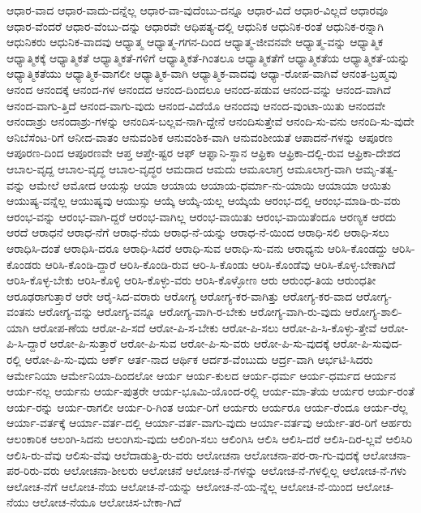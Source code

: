 {ಆಧಾರ-ವಾದ
ಆಧಾರ-ವಾದು-ದನ್ನೆಲ್ಲ
ಆಧಾರ-ವಾ-ವುದೆಂಬು-ದನ್ನೂ
ಆಧಾರ-ವಿದೆ
ಆಧಾರ-ವಿಲ್ಲದೆ
ಆಧಾರವೂ
ಆಧಾರ-ವೆಂದರೆ
ಆಧಾರ-ವೆಂಬು-ದನ್ನು
ಆಧಾರವೇ
ಆಧಿಪತ್ಯ-ದಲ್ಲಿ
ಆಧುನಿಕ
ಆಧುನಿಕ-ರಂತೆ
ಆಧುನಿಕ-ರನ್ನಾಗಿ
ಆಧುನಿಕರು
ಆಧುನಿಕ-ವಾದವು
ಆಧ್ಯಾತ್ಮ
ಆಧ್ಯಾತ್ಮ-ಗಗನ-ದಿಂದ
ಆಧ್ಯಾತ್ಮ-ಜೀವನವೇ
ಆಧ್ಯಾತ್ಮ-ವನ್ನು
ಆಧ್ಯಾತ್ಮಿಕ
ಆಧ್ಯಾತ್ಮಿಕಕ್ಕೆ
ಆಧ್ಯಾತ್ಮಿಕತೆ
ಆಧ್ಯಾತ್ಮಿಕತೆ-ಗಳಿಗೆ
ಆಧ್ಯಾತ್ಮಿಕತೆ-ಗಿಂತಲೂ
ಆಧ್ಯಾತ್ಮಿಕತೆಗೆ
ಆಧ್ಯಾತ್ಮಿಕತೆಯ
ಆಧ್ಯಾತ್ಮಿಕತೆ-ಯನ್ನು
ಆಧ್ಯಾತ್ಮಿಕತೆಯು
ಆಧ್ಯಾತ್ಮಿಕ-ವಾಗಲೀ
ಆಧ್ಯಾತ್ಮಿಕ-ವಾಗಿ
ಆಧ್ಯಾತ್ಮಿಕ-ವಾದವು
ಆಧ್ಯಾ-ರೋಪ-ವಾಗಿವೆ
ಆನಂತ-ಬ್ರಹ್ಮವು
ಆನಂದ
ಆನಂದಕ್ಕೆ
ಆನಂದ-ಗಳ
ಆನಂದದ
ಆನಂದ-ದಿಂದಲೂ
ಆನಂದ-ಪಡುವ
ಆನಂದ-ವನ್ನು
ಆನಂದ-ವಾಗಿದೆ
ಆನಂದ-ವಾಗು-ತ್ತಿದೆ
ಆನಂದ-ವಾಗು-ವುದು
ಆನಂದ-ವಿದೆಯೊ
ಆನಂದವು
ಆನಂದ-ವುಂಟಾ-ಯಿತು
ಆನಂದವೇ
ಆನಂದಾಶ್ರು
ಆನಂದಾಶ್ರು-ಗಳನ್ನು
ಆನಂದಿಸ-ಬಲ್ಲವ-ನಾಗಿ-ದ್ದೇನೆ
ಆನಂದಿಸುತ್ತೇವೆ
ಆನಂದಿ-ಸು-ವನು
ಆನಂದಿ-ಸು-ವುದೇ
ಆನಿಬೆಸೆಂಟ-ರಿಗೆ
ಆನೀದ-ವಾತಂ
ಆನುವಂಶಿಕ
ಆನುವಂಶಿಕ-ವಾಗಿ
ಆನುವಂಶೀಯತೆ
ಆಪಾದನೆ-ಗಳನ್ನು
ಆಪೂರಣ
ಆಪೂರಣ-ದಿಂದ
ಆಪೂರಣವೇ
ಆಪ್ತ
ಆಪ್ತೇ-ಷ್ಟರ
ಆಫ್
ಆಫ್ಘಾನಿ-ಸ್ಥಾನ
ಆಫ್ರಿಕಾ
ಆಫ್ರಿಕಾ-ದಲ್ಲಿ-ರುವ
ಆಫ್ರಿಕಾ-ದೇಶದ
ಆಬಾಲ-ವೃದ್ದ
ಆಬಾಲ-ವೃದ್ಧ
ಆಬಾಲ-ವೃದ್ಧರ
ಆಮದಾದ
ಆಮದು
ಆಮೂಲಾಗ್ರ
ಆಮೂಲಾಗ್ರ-ವಾಗಿ
ಆಮೃ-ತತ್ವ-ವನ್ನು
ಆಮೇಲೆ
ಆಮೋದ
ಆಯಸ್ಸು
ಆಯಾ
ಆಯಾಯ
ಆಯಾಯ-ಧರ್ಮಾ-ನು-ಯಾಯಿ
ಆಯಾಯಾ
ಆಯಿತು
ಆಯುಷ್ಯ-ವನ್ನೆಲ್ಲ
ಆಯುಷ್ಯವು
ಆಯುಸ್ಸು
ಆಯ್ಕೆ
ಆಯ್ಕೆ-ಯಲ್ಲ
ಆಯ್ಕೆಯೆ
ಆರಂಭ-ದಲ್ಲಿ
ಆರಂಭ-ಮಾಡಿ-ರು-ವರು
ಆರಂಭ-ವನ್ನು
ಆರಂಭ-ವಾಗಿ-ದ್ದರೆ
ಆರಂಭ-ವಾಗಿಲ್ಲ
ಆರಂಭ-ವಾಯಿತು
ಆರಂಭ-ವಾಯಿತೆಂದೂ
ಆರಣ್ಯಕ
ಆರದು
ಆರದೆ
ಆರಾಧನೆ
ಆರಾಧ-ನೆಗೆ
ಆರಾಧ-ನೆಯ
ಆರಾಧ-ನೆ-ಯನ್ನು
ಆರಾಧ-ನೆ-ಯಿಂದ
ಆರಾಧಿ-ಸಲಿ
ಆರಾಧಿ-ಸಲು
ಆರಾಧಿಸಿ-ದಂತೆ
ಆರಾಧಿಸಿ-ದರೂ
ಆರಾಧಿ-ಸಿದರೆ
ಆರಾಧಿ-ಸುವ
ಆರಾಧಿ-ಸು-ವನು
ಆರಾಧ್ಯನು
ಆರಿಸಿ-ಕೊಂಡದ್ದು
ಆರಿಸಿ-ಕೊಂಡರು
ಆರಿಸಿ-ಕೊಂಡಿ-ದ್ದಾರೆ
ಆರಿಸಿ-ಕೊಂಡಿ-ರುವ
ಆರಿ-ಸಿ-ಕೊಂಡು
ಆರಿಸಿ-ಕೊಂಡೆವು
ಆರಿಸಿ-ಕೊಳ್ಳ-ಬೇಕಾಗಿದೆ
ಆರಿಸಿ-ಕೊಳ್ಳ-ಬೇಕು
ಆರಿಸಿ-ಕೊಳ್ಳಿ
ಆರಿಸಿ-ಕೊಳ್ಳು-ವರು
ಆರಿಸಿ-ಕೊಳ್ಳೋಣ
ಆರು
ಆರುಂಧ-ತಿಯ
ಆರುಂಧತೀ
ಆರೂಢರಾಗುತ್ತಾರೆ
ಆರೇ
ಆರೈ-ಸಿದ-ವರಾರು
ಆರೋಗ್ಯ
ಆರೋಗ್ಯ-ಕರ-ವಾಗಿತ್ತು
ಆರೋಗ್ಯ-ಕರ-ವಾದ
ಆರೋಗ್ಯ-ವಂತನು
ಆರೋಗ್ಯ-ವನ್ನು
ಆರೋಗ್ಯ-ವನ್ನೂ
ಆರೋಗ್ಯ-ವಾಗಿ-ರ-ಬೇಕು
ಆರೋಗ್ಯ-ವಾಗಿ-ರು-ವುದು
ಆರೋಗ್ಯ-ಶಾಲಿ-ಯಾಗಿ
ಆರೋಪ-ಣೆಯ
ಆರೋ-ಪಿ-ಸದೆ
ಆರೋ-ಪಿ-ಸ-ಬೇಕು
ಆರೋ-ಪಿ-ಸಲು
ಆರೋ-ಪಿ-ಸಿ-ಕೊಳ್ಳು-ತ್ತೇವೆ
ಆರೋ-ಪಿ-ಸಿ-ದ್ದಾರೆ
ಆರೋ-ಪಿ-ಸುತ್ತಾರೆ
ಆರೋ-ಪಿ-ಸುವ
ಆರೋ-ಪಿ-ಸು-ವರು
ಆರೋ-ಪಿ-ಸು-ವುದಕ್ಕೆ
ಆರೋ-ಪಿ-ಸುವುದ-ರಲ್ಲಿ
ಆರೋ-ಪಿ-ಸು-ವುದು
ಆರ್ಕ್
ಆರ್ತ-ನಾದ
ಆರ್ಥಿಕ
ಆರ್ದಶ-ವೆಂಬುದು
ಆರ್ದ್ರ-ವಾಗಿ
ಆರ್ಭಟಿ-ಸಿದರು
ಆರ್ಮೇನಿಯಾ
ಆರ್ಮೇನಿಯಾ-ದಿಂದಲೋ
ಆರ್ಯ
ಆರ್ಯ-ಕುಲದ
ಆರ್ಯ-ಧರ್ಮ
ಆರ್ಯ-ಧರ್ಮದ
ಆರ್ಯನ
ಆರ್ಯ-ನಲ್ಲ
ಆರ್ಯನು
ಆರ್ಯ-ಪುತ್ರರೇ
ಆರ್ಯ-ಭೂಮಿ-ಯೊಂದ-ರಲ್ಲಿ
ಆರ್ಯ-ಮಾ-ತೆಯ
ಆರ್ಯರ
ಆರ್ಯ-ರಂತೆ
ಆರ್ಯ-ರನ್ನು
ಆರ್ಯ-ರಾಗಲೀ
ಆರ್ಯ-ರಿ-ಗಿಂತ
ಆರ್ಯ-ರಿಗೆ
ಆರ್ಯರು
ಆರ್ಯರೂ
ಆರ್ಯ-ರೆಂದೂ
ಆರ್ಯ-ರೆಲ್ಲ
ಆರ್ಯಾ-ವರ್ತಕ್ಕೆ
ಆರ್ಯಾ-ವರ್ತ-ದಲ್ಲಿ
ಆರ್ಯಾ-ವರ್ತ-ವಾಗು-ವುದು
ಆರ್ಯಾ-ವರ್ತವು
ಆರ್ಯೇ-ತರ-ರಿಗೆ
ಆರ್ಹರು
ಆಲಂಕಾರಿಕ
ಆಲಂಗಿ-ಸಿದನು
ಆಲಂಗಿಸು-ವುದು
ಆಲಿಂಗಿ-ಸಲು
ಆಲಿಂಗಿಸಿ
ಆಲಿಸಿ
ಆಲಿಸಿ-ದರೆ
ಆಲಿಸಿ-ದಿರ-ಲ್ಲವೆ
ಆಲಿಸಿರಿ
ಆಲಿಸಿ-ರು-ವೆವು
ಆಲಿಸು-ವೆವು
ಆಲೆದಾಡುತ್ತಿ-ರು-ವರು
ಆಲೋಚನಾ
ಆಲೋಚನಾ-ಪರ-ರಾ-ಗು-ವುದಕ್ಕೆ
ಆಲೋಚನಾ-ಪರ-ರಿರು-ವರು
ಆಲೋಚನಾ-ಶೀಲರು
ಆಲೋಚನೆ
ಆಲೋಚ-ನೆ-ಗಳನ್ನು
ಆಲೋಚ-ನೆ-ಗಳಲ್ಲಿಲ್ಲ
ಆಲೋಚ-ನೆ-ಗಳು
ಆಲೋಚ-ನೆಗೆ
ಆಲೋಚ-ನೆಯ
ಆಲೋಚ-ನೆ-ಯನ್ನು
ಆಲೋಚ-ನೆ-ಯ-ನ್ನೆಲ್ಲ
ಆಲೋಚ-ನೆ-ಯಿಂದ
ಆಲೋಚ-ನೆಯು
ಆಲೋಚ-ನೆಯೂ
ಆಲೋಚಿಸ-ಬೇಕಾ-ಗಿದೆ
}
